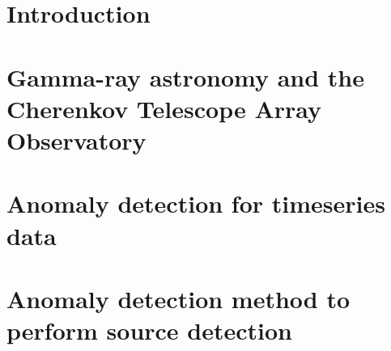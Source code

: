 \documentclass[oneside,openright,titlepage,numbers=noenddot,headinclude,footinclude=true,cleardoublepage=empty,listof=totoc,paper=a4,fontsize=11pt,american,BCOR=5mm]{scrreprt}
\begin{document}
  \frenchspacing
  \raggedbottom
  
  \pagestyle{plain}
  
  \singlespacing
  
  
  
  
  
  
  \cleardoublepage
  \pagestyle{scrheadings}
  \onehalfspacing
  
  \chapter{Introduction}\label{c:Introduction}
   
  \newpage

  \chapter{Gamma-ray astronomy and the Cherenkov Telescope Array Observatory}\label{c:Background}
  
  \newpage
 
  \chapter{Anomaly detection for timeseries data}\label{c:Background-2}
  
  \newpage
   
  \chapter{Anomaly detection method to perform source detection}\label{c:Contribution-1}
   
  \newpage
\end{document}
